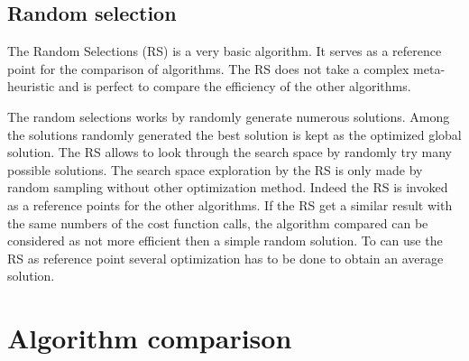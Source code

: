 

\subsection{Random selection }

The Random Selections (RS) is a very basic algorithm. It serves as a reference point for the comparison of  algorithms. The RS does not take a complex meta-heuristic and is perfect to compare the efficiency of the other algorithms.

The random selections works by randomly generate numerous solutions. Among the solutions randomly generated the best solution is kept as the optimized global solution. The RS allows to look through the search space by randomly try many possible solutions. The search space exploration by the RS is only made by random sampling without other optimization method. 
Indeed the RS is invoked as a reference points for the other algorithms. If the RS get a similar result with the same numbers of the cost function calls, the algorithm compared can be considered as not more efficient then a simple random solution. 
To can use the RS as reference point several optimization has to be done to obtain an average solution.
  
%
%

\section{Algorithm comparison }\label{sec:GAvsPSO} 
%

